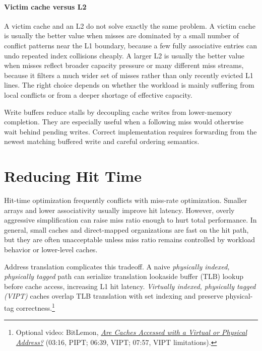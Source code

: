 

\paragraph{Victim cache versus L2}\label{par:auto-021b}
A victim cache and an L2 do not solve exactly the same problem.
A victim cache is usually the better value when misses are dominated by a small number of conflict patterns near the L1 boundary, because a few fully associative entries can undo repeated index collisions cheaply.
A larger L2 is usually the better value when misses reflect broader capacity pressure or many different miss streams, because it filters a much wider set of misses rather than only recently evicted L1 lines.
The right choice depends on whether the workload is mainly suffering from local conflicts or from a deeper shortage of effective capacity.

Write buffers reduce stalls by decoupling cache writes from lower-memory completion.
They are especially useful when a following miss would otherwise wait behind pending writes.
Correct implementation requires forwarding from the newest matching buffered write and careful ordering semantics.


\section{Reducing Hit Time}\label{sec:auto-030}
Hit-time optimization frequently conflicts with miss-rate optimization.
Smaller arrays and lower associativity usually improve hit latency.
However, overly aggressive simplification can raise miss ratio enough to hurt total performance.
In general, small caches and direct-mapped organizations are fast on the hit path, but they are often unacceptable unless miss ratio remains controlled by workload behavior or lower-level caches.

Address translation complicates this tradeoff.
A naive \textit{physically indexed, physically tagged} path can serialize translation lookaside buffer (TLB) lookup before cache access, increasing L1 hit latency.
\textit{Virtually indexed, physically tagged (VIPT)} caches overlap TLB translation with set indexing and preserve physical-tag correctness.\footnote{Optional video: BitLemon, \href{https://youtu.be/YnXb3p57XnE?t=196}{\emph{Are Caches Accessed with a Virtual or Physical Address?}} (03:16, PIPT; 06:39, VIPT; 07:57, VIPT limitations).}

